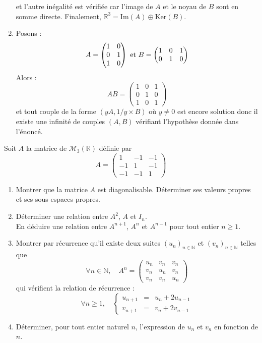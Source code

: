 \documentclass[a4paper,10pt]{report}
\begin{document}
\begin{enumerate}
et l'autre inégalité est vérifiée car l'image de $A$ et le noyau de $B$ sont en somme directe. Finalement, $\mathbb{R}^3 = \textrm{Im}(A) \oplus \textrm{Ker}(B)$.
\item Posons :
$$ A  = \begin{pmatrix}
1 & 0 \\
0 & 1\\
1 & 0 \\
\end{pmatrix} 
\hbox{ et } B = \begin{pmatrix}
1 & 0 & 1 \\
0 & 1 & 0
\end{pmatrix}$$
Alors :
$$ AB = \begin{pmatrix}
1 & 0 & 1 \\
0 & 1 & 0 \\
1 & 0 & 1 
\end{pmatrix}$$
et tout couple de la forme $(yA, 1/y \times B)$ où $y \neq 0$ est encore solution donc il existe une infinité de couples $(A,B)$ vérifiant l'hypothèse donnée dans l'énoncé.
\end{enumerate}

\begin{Exercice}{}
Soit $A$ la matrice de $\mathcal{M}_{3}\left(\mathbb{R}\right)$
d\'efinie par
\[
A=\left(\begin{array}{ccc}
1 & -1 & -1\\
-1 & 1 & -1\\
-1 & -1 & 1
\end{array}\right)
\]

\begin{enumerate}
\item Montrer que la matrice $A$ est diagonalisable. D\'eterminer ses valeurs propres et ses sous-espaces propres.
\item D\'eterminer une relation entre $A^{2}$, $A$ et $I_{n}$.\\
En d\'eduire une relation entre $A^{n+1}$, $A^{n}$ et $A^{n-1}$ pour
tout entier $n\geq1$.
\item Montrer par r\'ecurrence qu'il existe deux suites $\left(u_{n}\right)_{n\in\mathbb{N}}$
et $\left(v_{n}\right)_{n\in\mathbb{N}}$ telles que
\[
\forall n\in\mathbb{N},\quad A^{n}=\left(\begin{array}{ccc}
u_{n} & v_{n} & v_{n}\\
v_{n} & u_{n} & v_{n}\\
v_{n} & v_{n} & u_{n}
\end{array}\right)
\]
qui v\'erifient la relation de r\'ecurrence :
\[
\forall n\geq1,\quad\left\{ \begin{array}{ccc}
u_{n+1} & = & u_{n}+2u_{n-1}\\
v_{n+1} & = & v_{n}+2v_{n-1}
\end{array}\right.
\]
\item D\'eterminer, pour tout entier naturel $n$, l'expression de $u_{n}$
et $v_{n}$ en fonction de $n$.
\end{enumerate}
\end{Exercice}
\end{document}
